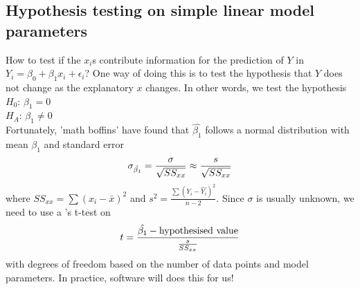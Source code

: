\subsection{Hypothesis testing on simple linear model parameters}

How to test if the $x_i$s contribute information for the prediction of $Y$ in $Y_i=\beta_0+\beta_1x_i+\epsilon_i$? One way of doing this is to test the hypothesis that $Y$ does not change as the explanatory $x$ changes. In other words, we test the hypothesis \\
$H_0$: $\beta_1=0$ \\
$H_A$: $\beta_1\neq 0$ \\
Fortunately, 'math boffins' have found that $\hat{\beta_1}$ follows a normal distribution with mean $\beta_1$ and standard error 
\begin{align}
	\sigma_{\hat{\beta_1}} = \frac{\sigma}{\sqrt{SS_{xx}}}\approx \frac{s}{\sqrt{SS_{xx}}}\notag
\end{align}
where $SS_{xx}=\sum(x_i-\bar{x})^2$ and $s^2=\frac{\sum (Y_i-\hat{Y_i})^2}{n-2}$. Since $\sigma$ is usually unknown, we need to use a 's t-test on
\begin{align}
	t = \frac{\hat{\beta_1}-\text{hypothesised value}}{\frac{s}{SS_{xx}}} \notag
\end{align}
with degrees of freedom based on the number of data points and model parameters. In practice, software will does this for us!